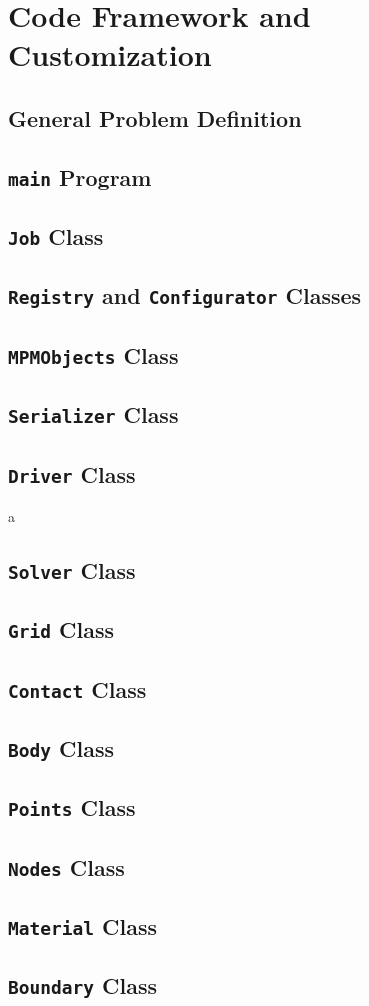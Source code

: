 \chapter{Code Framework and Customization} \label{sec:code}
\section{General Problem Definition}

\section{\texttt{main} Program}

\section{\texttt{Job} Class}

\section{\texttt{Registry} and \texttt{Configurator} Classes}

\section{\texttt{MPMObjects} Class}

\section{\texttt{Serializer} Class}

\section{\texttt{Driver} Class}
a
\section{\texttt{Solver} Class}

\section{\texttt{Grid} Class}

\section{\texttt{Contact} Class}

\section{\texttt{Body} Class}

\section{\texttt{Points} Class}

\section{\texttt{Nodes} Class}

\section{\texttt{Material} Class}

\section{\texttt{Boundary} Class}